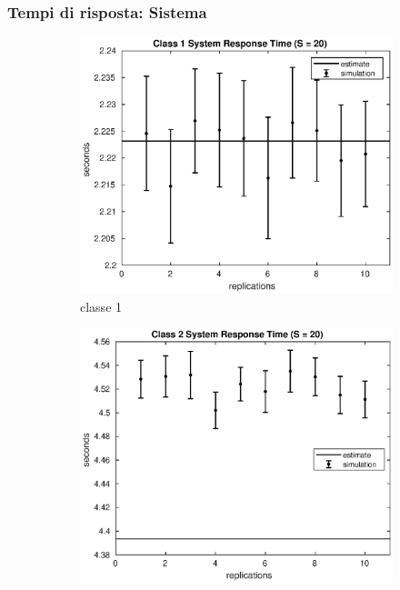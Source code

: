 \subsubsection{Tempi di risposta: Sistema}
%
\begin{figure}[!h]
\centering
%
\begin{subfigure}[t]{0.49\textwidth}
\includegraphics[width=\textwidth]{figures/simul/20_500K_s1}
\caption{classe 1}
\label{20_s1}
\end{subfigure}
%
\begin{subfigure}[t]{0.49\textwidth}
\includegraphics[width=\textwidth]{figures/simul/20_500K_s2}

\end{subfigure}
\end{figure}
